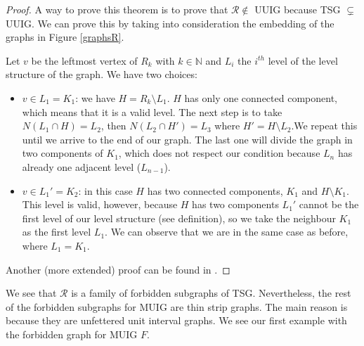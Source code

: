\begin{proof}
  A way to prove this theorem is to prove that $\mathcal{R} \notin$ UUIG because TSG $\subsetneq$ UUIG. We can prove this by taking into consideration the embedding of the graphs in Figure \ref{graphsR}.

  Let $v$ be the leftmost vertex of $R_k$ with $k \in \mathbb{N}$ and $L_i$ the $i^{th}$ level of the level structure of the graph. We have two choices:

  \begin{itemize}
    \item $v\in L_1 = K_1$: we have $H = R_k\setminus L_1$.
    $H$ has only one connected component, which means that it is a valid level. The next step is to take $N(L_1 \cap H) = L_2$, then $N(L_2 \cap H') = L_3$ where $H' = H\setminus L_2$.We repeat this until we arrive to the end of our graph. The last one will divide the graph in two components of $K_1$, which does not respect our condition because $L_n$ has already one adjacent level ($L_{n-1}$).
    \item $v\in L_1' = K_2$: in this case $H$ has two connected components, $K_1$ and $H\setminus K_1$. This level is valid, however, because $H$ has two components $L_1'$ cannot be the first level of our level structure (see definition), so we take the neighbour $K_1$ as the first level $L_1$. We can observe that we are in the same case as before, where $L_1 = K_1$.
  \end{itemize}

  Another (more extended) proof can be found in \cite{hayashiThinStripGraphs2017}.
\end{proof}

We see that $\mathcal{R}$ is a family of forbidden subgraphs of TSG. Nevertheless, the rest of the forbidden subgraphs for MUIG are thin strip graphs. The main reason is because they are unfettered unit interval graphs. We see our first example with the forbidden graph for MUIG $F$.

